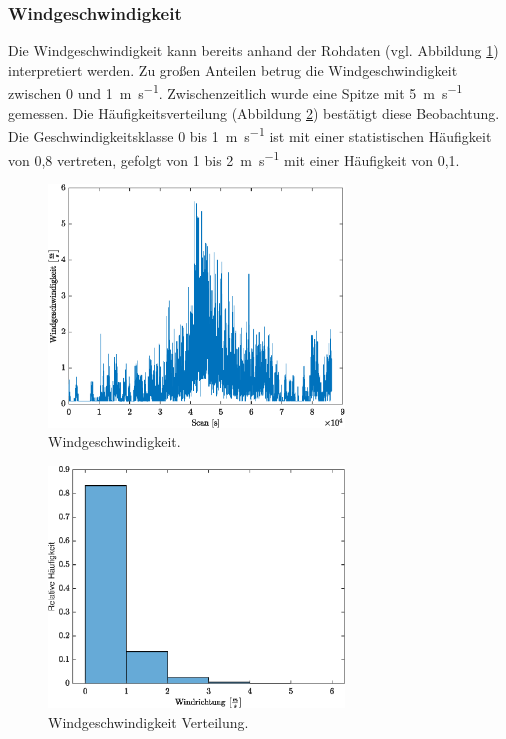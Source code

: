 \subsubsection{Windgeschwindigkeit}
Die Windgeschwindigkeit kann bereits anhand der Rohdaten (vgl. Abbildung \ref{fig:windspd}) interpretiert werden. Zu großen Anteilen betrug die Windgeschwindigkeit zwischen 0 und \SI{1}{\meter\per\second}. Zwischenzeitlich wurde eine Spitze mit \SI{5}{\meter\per\second} gemessen. Die Häufigkeitsverteilung (Abbildung \ref{fig:windspdCN}) bestätigt diese Beobachtung. Die Geschwindigkeitsklasse 0 bis \SI{1}{\meter\per\second} ist mit einer statistischen Häufigkeit von 0,8 vertreten, gefolgt von 1 bis \SI{2}{\meter\per\second} mit einer Häufigkeit von 0,1.
\begin{figure}[H]
	\centering
	\includegraphics[width=0.7\textwidth]{../DATA/Windgeschwindigkeit.eps}
	\caption[Windgeschwindigkeit]{Windgeschwindigkeit.}
	\label{fig:windspd}
\end{figure}

\begin{figure}[H]
	\centering
	\includegraphics[width=0.7\textwidth]{../DATA/WindspdCN.eps}
	\caption[Windgeschwindigkeit Verteilung]{Windgeschwindigkeit Verteilung.}
	\label{fig:windspdCN}
\end{figure}